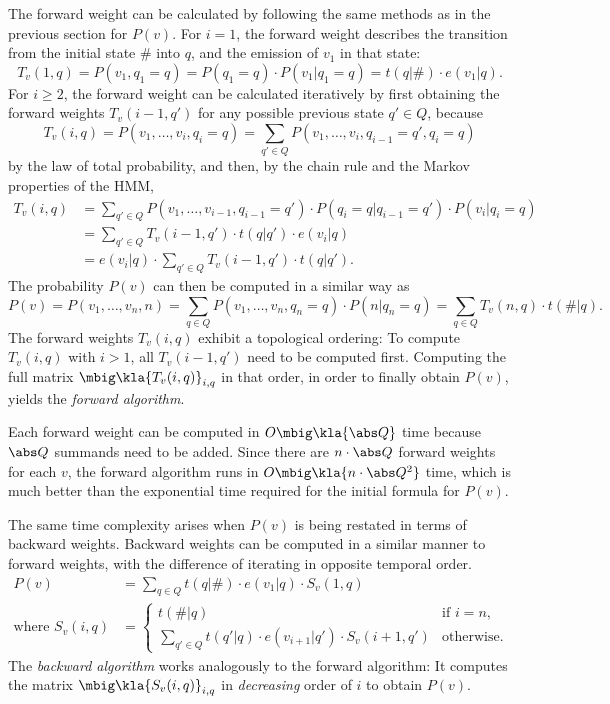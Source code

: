The forward weight can be calculated by following the same methods as in the
previous section for $P(v)$. For $i = 1$, the forward weight describes the
transition from the initial state $\#$ into $q$, and the emission of $v_1$ in
that state:
\[
 T_v(1,q) = P(v_1,q_1=q) = P(q_1=q) \cdot P(v_1|q_1=q) = t(q|\#) \cdot e(v_1|q).
\]
For $i\geq 2$, the forward weight can be calculated iteratively by first
obtaining the forward weights $T_v(i-1,q')$ for any possible previous state
$q'\in Q$, because
\[
 T_v(i,q) = P(v_1,\ldots,v_i,q_i=q) = \sum_{q'\in Q} P(v_1,\ldots,v_i,q_{i-1}=q',q_i=q)
\]
by the law of total probability, and then, by the chain rule and the Markov
properties of the HMM,
\begin{align*}
 T_v(i,q)
  &= \sum_{q'\in Q} P(v_1,\ldots,v_{i-1},q_{i-1}=q') \cdot P(q_i=q|q_{i-1}=q') \cdot P(v_i|q_i=q) \\
  &= \sum_{q'\in Q} T_v(i-1,q') \cdot t(q|q') \cdot e(v_i|q) \\
  &= e(v_i|q) \cdot \sum_{q'\in Q} T_v(i-1,q') \cdot t(q|q').
\end{align*}
The probability $P(v)$ can then be computed in a similar way as
\[
 P(v) = P(v_1,\ldots,v_n,n) = \sum_{q\in Q} P(v_1,\ldots,v_n,q_n=q) \cdot P(n|q_n=q) = \sum_{q\in Q} T_v(n,q) \cdot t(\#|q).
\]
The forward weights $T_v(i,q)$ exhibit a topological ordering: To compute
$T_v(i,q)$ with $i>1$, all $T_v(i-1,q')$ need to be computed first. Computing
the full matrix $\mbig\kla{T_v(i,q)}_{i,q}$ in that order, in order to finally
obtain $P(v)$, yields the \emph{forward algorithm}.

Each forward weight can be computed in $O\mbig\kla{\abs Q}$ time because $\abs
Q$ summands need to be added. Since there are $n\cdot\abs Q$ forward weights
for each $v$, the forward algorithm runs in $O\mbig\kla{n \cdot \abs Q^2}$
time, which is much better than the exponential time required for the initial
formula for $P(v)$.

The same time complexity arises when $P(v)$ is being restated in terms of
backward weights. Backward weights can be computed in a similar manner to
forward weights, with the difference of iterating in opposite temporal order.
\begin{align*}
 P(v) &= \sum_{q\in Q} t(q|\#) \cdot e(v_1|q) \cdot S_v(1,q) \\
 \text{where } S_v(i,q) &= \begin{cases}
  t(\#|q) & \text{if }i=n, \\
  \sum_{q'\in Q} t(q'|q) \cdot e(v_{i+1}|q') \cdot S_v(i+1,q') & \text{otherwise}.
 \end{cases}
\end{align*}
The \emph{backward algorithm} works analogously to the forward algorithm: It
computes the matrix $\mbig\kla{S_v(i,q)}_{i,q}$ in \emph{decreasing} order of
$i$ to obtain $P(v)$.

